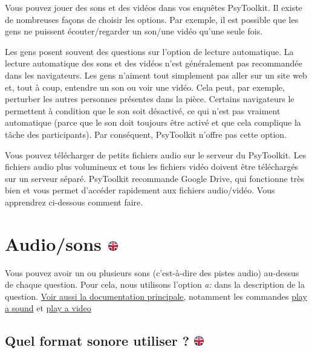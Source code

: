 \documentclass[
]{book}
\begin{document}
Vous pouvez jouer des sons et des vidéos dans vos enquêtes PsyToolkit. Il existe de nombreuses façons de choisir les options. Par exemple, il est possible que les gens ne puissent écouter/regarder un son/une vidéo qu'une seule fois.

Les gens posent souvent des questions sur l'option de lecture automatique. La lecture automatique des sons et des vidéos n'est généralement pas recommandée dans les navigateurs. Les gens n'aiment tout simplement pas aller sur un site web et, tout à coup, entendre un son ou voir une vidéo. Cela peut, par exemple, perturber les autres personnes présentes dans la pièce. Certains navigateurs le permettent à condition que le son soit désactivé, ce qui n'est pas vraiment automatique (parce que le son doit toujours être activé et que cela complique la tâche des participants). Par conséquent, PsyToolkit n'offre pas cette option.

Vous pouvez télécharger de petits fichiers audio sur le serveur du PsyToolkit. Les fichiers audio plus volumineux et tous les fichiers vidéo doivent être téléchargés sur un serveur séparé. PsyToolkit recommande Google Drive, qui fonctionne très bien et vous permet d'accéder rapidement aux fichiers audio/vidéo. Vous apprendrez ci-dessous comment faire.

\hypertarget{audiosons}{%
\section[Audio/sons ]{\texorpdfstring{Audio/sons \href{https://www.psytoolkit.org/lessons/surveyaudiovideo.html\#_audio_sound}{\protect\includegraphics{img/ukflag.png}}}{Audio/sons }}\label{audiosons}}

Vous pouvez avoir un ou plusieurs sons (c'est-à-dire des pistes audio) au-dessus de chaque question. Pour cela, nous utilisons l'option \emph{a:} dans la description de la question. \protect\hyperlink{s8}{Voir aussi la documentation principale}, notamment les commandes \protect\hyperlink{playasound}{play a sound} et \protect\hyperlink{playavideo}{play a video}

\hypertarget{quel-format-sonore-utiliser}{%
\subsection[Quel format sonore utiliser ? ]{\texorpdfstring{Quel format sonore utiliser ? \href{https://www.psytoolkit.org/lessons/surveyaudiovideo.html\#_what_sound_format_to_use}{\protect\includegraphics{img/ukflag.png}}}{Quel format sonore utiliser ? }}\label{quel-format-sonore-utiliser}}
\end{document}
